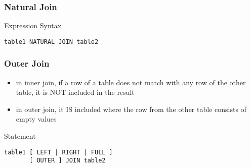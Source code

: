 \documentclass[dvipsnames]{beamer}
\theoremstyle{plain}
\begin{document}
\begin{frame}[fragile]
  \frametitle{Natural Join}

  \begin{block}{Expression Syntax}
    \begin{lstlisting}
table1 NATURAL JOIN table2
    \end{lstlisting}
  \end{block}
\end{frame}

\begin{frame}[fragile]
  \frametitle{Outer Join}

  \begin{itemize}
    \item in inner join, if a row of a table does not match with any row
      of the other table, it is NOT included in the result

    \item in outer join, it IS included where the row from the other table
      consists of empty values
  \end{itemize}

  \pause
  \begin{block}{Statement}
    \begin{lstlisting}
table1 [ LEFT | RIGHT | FULL ]
       [ OUTER ] JOIN table2
    \end{lstlisting}
  \end{block}
\end{frame}
\end{document}
